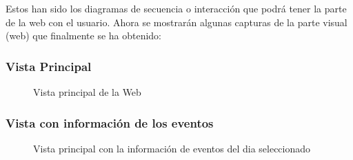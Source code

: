Estos han sido los diagramas de secuencia o interacción que podrá tener la parte de la web con el usuario. Ahora se mostrarán algunas capturas de la parte visual (web) que finalmente se ha obtenido:

\subsubsection{Vista Principal}

\begin{figure}[H]
\caption{Vista principal de la Web}
\end{figure}

\subsubsection{Vista con información de los eventos}

\begin{figure}[H]
\caption{Vista principal con la información de eventos del dia seleccionado}
\end{figure}

